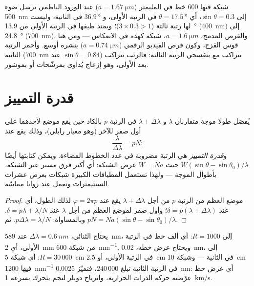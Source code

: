 \begin{example}\label{ex:b2:gratings:examples}
شبكة فيها $600$ خط في المليمتر ($a = \qty{1.67}{\micro m}$) عند الورود
الناظمي ترسل ضوء \qty{500}{nm} إلى $\sin\theta = 0.3$، أي $\theta = \qty{17.5}{\degree}$ في
الرتبة الأولى، و $\qty{36.9}{\degree}$ في الثانية، وليست لها رتبة ثالثة
($3 \times 0.3 > 1$)؛ ويمتد طيفها في الرتبة الأولى من \qty{13.9}{\degree}
(\qty{400}{nm}) إلى \qty{24.8}{\degree} (\qty{700}{nm}). والقرص المدمج، $a =
\qty{1.6}{\micro m}$، شبكة كهذه في الانعكاس --- ومن هنا قوس القزح،
وكون قرص الفيديو الرقمي ($a = \qty{0.74}{\micro m}$) ينشره أوسع. وأحمر
الرتبة الثانية (\qty{700}{nm} عند $\sin\theta = 0.84$) يتراكب مع بنفسجي الرتبة الثالثة:
فالرتب تتراكب بعد الأولى، وهو إزعاج يُداوى بمرشّحات
أو بموشور.
\end{example}

\section{قدرة التمييز}

\begin{proposition}\label{prop:b2:gratings:resolution}
يُفصَل طولا موجة متقاربان $\lambda$ و $\lambda + \Delta\lambda$ في الرتبة $p$ بالكاد
حين يقع موضع  لأحدهما على أول صفر للآخر
(وهو معيار رايلي)، وذلك يقع عند
\[
\frac\lambda{\Delta\lambda} = pN :
\]
و\emph{قدرة التمييز} هي الرتبة مضروبة في عدد الخطوط
المضاءة. ويمكن كتابتها أيضًا $W(\sin\theta - \sin\theta_0)/\lambda$ حيث $W = Na$
عرض الشبكة: أي أكبر فرق مسير عبر الشبكة،
بأطوال الموجة --- ولهذا تستعمل المطيافات الكبيرة شبكات بعرض عشرات
السنتيمترات وتعمل عند زوايا مماسّة.
\end{proposition}

\begin{proof}
موضع العظم من الرتبة $p$ من أجل $\lambda + \Delta\lambda$ يقع عند $\varphi = 2\pi p$ لذلك
الطول، أي عند $\delta = p(\lambda + \Delta\lambda)$؛ وأول صفر لموضع العظم
من أجل $\lambda$ عند $\delta = p\lambda + \lambda/N$. وبالمساواة: $p\Delta\lambda = \lambda/N$. ثم $pN =
Na(\sin\theta - \sin\theta_0)/\lambda$.
\end{proof}

\begin{example}\label{ex:b2:gratings:sodium}
يحتاج الثنائي، $\Delta\lambda = \qty{0.6}{nm}$ عند \qty{589}{nm}، إلى $R = 1000$: أي
ألف خط في الرتبة الأولى، أي \qty{2}{mm} من شبكة \qty{600}{mm^{-1}}.
ويحتاج عرض خطه، \qty{0.02}{nm}، إلى $R = 30\,000$: أي شبكة \qty{5}{cm}
في الرتبة الأولى، أو \qty{2.5}{cm} في الثانية --- وشبكة
\qty{10}{cm} فيها \qty{1200}{mm^{-1}} في الرتبة الثانية تبلغ
$240\,000$، فتميّز \qty{0.0025}{nm}: أي عرض خط عرّضته
حركة الذرات الحرارية، وانزياح دوبلر لنجم يتحرك
بسرعة \qty{1}{km/s}.
\end{example}

